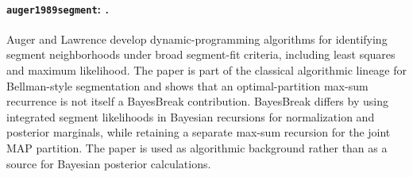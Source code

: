 \paragraph{\texttt{auger1989segment}: \citet{auger1989segment}.}
Auger and Lawrence develop dynamic-programming algorithms for identifying segment neighborhoods under broad segment-fit criteria, including least squares and maximum likelihood. The paper is part of the classical algorithmic lineage for Bellman-style segmentation and shows that an optimal-partition max-sum recurrence is not itself a BayesBreak contribution. BayesBreak differs by using integrated segment likelihoods in Bayesian recursions for normalization and posterior marginals, while retaining a separate max-sum recursion for the joint MAP partition. The paper is used as algorithmic background rather than as a source for Bayesian posterior calculations.
